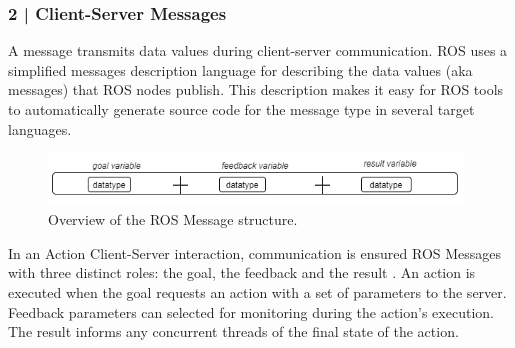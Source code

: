 


    
\subsubsection{2 | Client-Server Messages}


A message transmits data values during client-server communication. ROS uses a simplified messages description language \cite{ros_docs} for describing the data values (aka messages) that ROS nodes publish. This description makes it easy for ROS tools to automatically generate source code for the message type in several target languages.

\begin{figure}[!h]
    \raggedright
    \includegraphics[width=11cm]{images/testbed/microservice/ros_msg_structure.png}
    \caption{Overview of the ROS Message structure.}
\end{figure}

In an Action Client-Server interaction, communication is ensured ROS Messages with three distinct roles: the goal, the feedback and the result \cite{ros_docs}. An action is executed when the goal requests an action with a set of parameters to the server. Feedback parameters can selected for monitoring during the action's execution. The result informs any concurrent threads of the final state of the action. 


